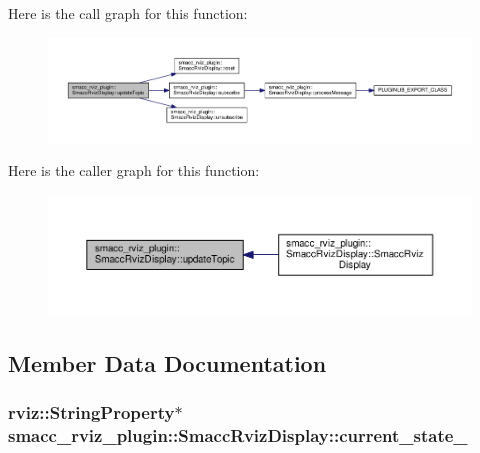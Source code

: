Here is the call graph for this function\+:
\nopagebreak
\begin{figure}[H]
\begin{center}
\leavevmode
\includegraphics[width=350pt]{classsmacc__rviz__plugin_1_1SmaccRvizDisplay_adf332ae95bd83969b33ba713a60832fd_cgraph}
\end{center}
\end{figure}




Here is the caller graph for this function\+:
\nopagebreak
\begin{figure}[H]
\begin{center}
\leavevmode
\includegraphics[width=350pt]{classsmacc__rviz__plugin_1_1SmaccRvizDisplay_adf332ae95bd83969b33ba713a60832fd_icgraph}
\end{center}
\end{figure}




\subsection{Member Data Documentation}
\subsubsection[{\texorpdfstring{current\+\_\+state\+\_\+}{current_state_}}]{\setlength{\rightskip}{0pt plus 5cm}rviz\+::\+String\+Property$\ast$ smacc\+\_\+rviz\+\_\+plugin\+::\+Smacc\+Rviz\+Display\+::current\+\_\+state\+\_\+\hspace{0.3cm}{\ttfamily [private]}}\hypertarget{classsmacc__rviz__plugin_1_1SmaccRvizDisplay_a342ff238c1dfaa427f09ee205a9e92d5}{}\label{classsmacc__rviz__plugin_1_1SmaccRvizDisplay_a342ff238c1dfaa427f09ee205a9e92d5}


